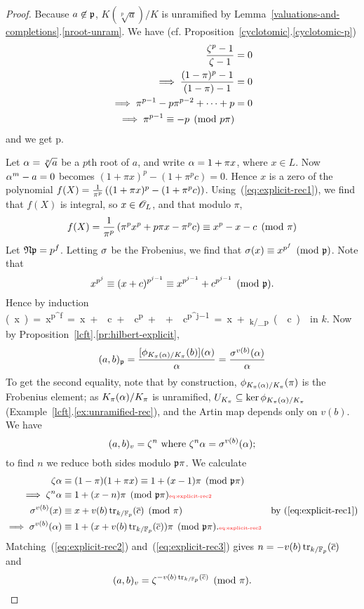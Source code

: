 \begin{proof}
Because $a\not\in \mathfrak{p}$, $K(\sqrt[p]{a})/K$ is unramified by Lemma~\ref{valuations-and-completions}.\ref{nroot-unram}. 
We have (cf. Proposition~\ref{cyclotomic}.\ref{cyclotomic-p}) 
\begin{align*}
\frac{\zeta^p-1}{\zeta-1}&=0\\
\implies \frac{(1-\pi)^p-1}{(1-\pi)-1}&=0\\
\implies \pi^{p-1}-p\pi^{p-2}+\cdots +p&=0\\
\implies \pi^{p-1}\equiv -p\pmod{p\pi}
\end{align*}
and we get 
p\pmod{\mfp}.
\eeq

Let $\alpha=\sqrt[p]{a}$ be a $p$th root of $a$, and write $\alpha=1+\pi x$, where $x\in L$. Now $\alpha^m-a=0$ becomes $(1+\pi x)^p-(1+\pi^pc)=0$. Hence $x$ is a zero of the polynomial $f(X)=\frac{1}{\pi^p}\left( {(1+\pi x)^p-(1+\pi^pc)} \right)$. 
Using~(\ref{eq:explicit-rec1}), we find that $f(X)$ is integral, so $x\in \mathscr{O}_L$, and that modulo $\pi$,
\[
f(X)=\frac{1}{\pi^p}\left( { \pi^px^p+p\pi x-\pi^pc} \right)\equiv x^p-x-c\pmod{\pi}\]
Let $\mathfrak{N}\mathfrak{p}=p^f$. Letting $\sigma$ be the Frobenius, we find that 
$\sigma(x)\equiv x^{p^f}\pmod{\mathfrak{p}}$. Note that
\[
x^{p^j}\equiv (x+c)^{p^{j-1}}\equiv x^{p^{j-1}}+c^{p^{j-1}}\pmod{\mathfrak{p}}.
\]
Hence by induction
\si(x)=x^{p^f}=x+\ol c+\ol c^p+\cdots +\ol c^{p^{j-1}}=x+\tr_{k/\F_p}(\ol c)
\eeq
in $k$. Now by Proposition~\ref{lcft}.\ref{pr:hilbert-explicit},
\[
(a,b)_{\mathfrak{p}}=\frac{[\phi_{K_{\pi}(\alpha)/K_{\pi}}(b)](\alpha)}{\alpha}=\frac{\sigma^{v(b)}(\alpha)}{\alpha}
\]
To get the second equality, note that by construction, $\phi_{K_{\pi}(\alpha)/K_{\pi}}(\pi)$ is the Frobenius element; as $K_{\pi}(\alpha)/K_{\pi}$ is unramified, $U_{K_{\pi}}\subseteq \ker \phi_{K_{\pi}(\alpha)/K_{\pi}}$ (Example~\ref{lcft}.\ref{ex:unramified-rec}), and the Artin map depends only on $v(b)$. We have
\[
(a,b)_v=\zeta^n\text{ where }\zeta^n\alpha=\sigma^{v(b)}(\alpha);
\]
to find $n$ we reduce both sides modulo $\mathfrak{p}\pi$. We calculate
\begin{align}
\ze\al&\equiv (1-\pi)(1+\pi x)\equiv 1+(x-1)\pi\pmod{\mfp\pi}\\
\implies \ze^n\al & \equiv 1+(x-n)\pi\pmod{\mfp\pi}
\llabel{eq:explicit-rec2}\\
\si^{v(b)}(x)&\equiv x+v(b)\tr_{k/\F_p}(\ol c)\pmod{\pi}&\text{by~(\ref{eq:explicit-rec1})}\\
\implies \si^{v(b)}(\al)&\equiv 1+(x+v(b)\tr_{k/\F_p}(\ol c))\pi\pmod{\mfp\pi}.\llabel{eq:explicit-rec3}
\end{align}
Matching~(\ref{eq:explicit-rec2}) and~(\ref{eq:explicit-rec3}) gives $n=-v(b)\operatorname{tr}_{k/\mathbb{F}_p}(\overline{c})$ and
\[
(a,b)_v=\zeta^{-v(b)\operatorname{tr}_{k/\mathbb{F}_p}(\overline{c})}\pmod{\pi}.
\]
\end{proof}
